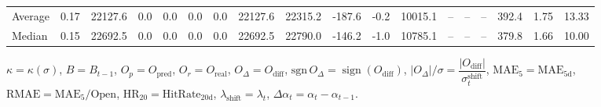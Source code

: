 \begin{threeparttable}
{\begin{tabular}{lrrrrrrrrrrrrrrrrr}
Average &     0.17 & 22127.6 &               0.0 &               0.0 &                0.0 &                0.0 & 22127.6 & 22315.2 &     -187.6 &                     -0.2 &             10015.1 &         -- &        -- &             -- &            392.4 &            1.75 &                  13.33 \\
 Median &     0.15 & 22692.5 &               0.0 &               0.0 &                0.0 &                0.0 & 22692.5 & 22790.0 &     -146.2 &                     -1.0 &             10785.1 &         -- &        -- &             -- &            379.8 &            1.66 &                  10.00 \\
\bottomrule
\end{tabular}
}
\begin{tablenotes}\footnotesize
\item $\kappa=\kappa(\sigma)$, $B=B_{t-1}$, $O_p=O_{\text{pred}}$, $O_r=O_{\text{real}}$, $O_\Delta=O_{\text{diff}}$, $\mathrm{sgn}\,O_\Delta=\operatorname{sign}(O_{\text{diff}})$, $|O_\Delta|/\sigma=\dfrac{|O_{\text{diff}}|}{\sigma_t^{\text{shift}}}$, $\mathrm{MAE}_5=\mathrm{MAE}_{5\text{d}}$, $\mathrm{RMAE}= \mathrm{MAE}_5 / \text{Open}$, $\mathrm{HR}_{20}=\mathrm{HitRate}_{20\text{d}}$, 
$\lambda_{\text{shift}}=\lambda_t$, 
$\Delta\alpha_t=\alpha_t-\alpha_{t-1}$.
\end{tablenotes}
\end{threeparttable}
\endgroup

